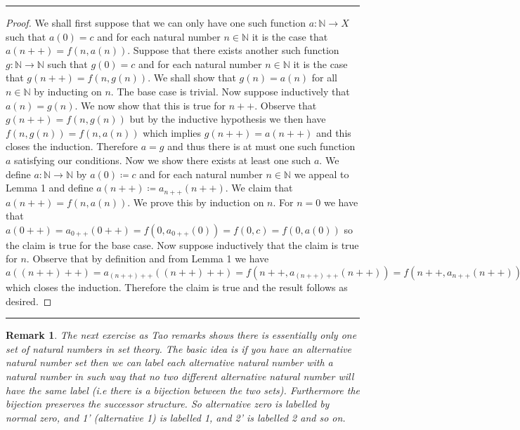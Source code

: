 \documentclass{article}
\newcommand{\lined}{\noindent\rule{\textwidth}{1pt}}
\newtheorem*{remark}{Remark}
\begin{document}
	\lined
	\begin{proof}
		We shall first suppose that we can only have one such function $a:\mathbb{N} \rightarrow X$ such that $a(0) = c$ and for each natural number $n \in \mathbb{N}$ it is the case that $a(n++) = f(n,a(n))$. Suppose that there exists another such function $g:\mathbb{N} \rightarrow \mathbb{N}$ such that $g(0) = c$ and for each natural number $n \in \mathbb{N}$ it is the case that $g(n++) = f(n,g(n))$. We shall show that $g(n) = a(n)$ for all $n \in \mathbb{N}$ by inducting on $n$. The base case is trivial. Now suppose inductively that $a(n) = g(n)$. We now show that this is true for $n++$. Observe that $g(n++) = f(n,g(n))$ but by the inductive hypothesis we then have $f(n,g(n)) = f(n,a(n))$ which implies $g(n++) = a(n++)$ and this closes the induction. Therefore $a = g$ and thus there is at must one such function $a$ satisfying our conditions. Now we show there exists at least one such $a$. We define $a:\mathbb{N} \rightarrow \mathbb{N}$ by $a(0) \coloneqq c$ and for each natural number $n \in \mathbb{N}$ we appeal to Lemma 1 and define $a(n++) \coloneqq a_{n++}(n++)$. We claim that $a(n++) = f(n,a(n))$. We prove this by induction on $n$. For $n = 0$ we have that $a(0++) = a_{0++}(0++) = f(0, a_{0++}(0))
		= f(0, c) = f(0, a(0))$ so the claim is true for the base case.
		Now suppose inductively that the claim is true for $n$. Observe that by definition and from Lemma 1 we have $a((n++)++) = a_{(n++)++}((n++)++) = f(n++,a_{(n++)++}(n++)) = f(n++, a_{n++}(n++)) =
		f(n, a(n++))$ which closes the induction. Therefore the claim is true and the result follows as desired.
		
	\end{proof}
	
	\lined
	
	\newpage
	
	\begin{remark}
		The next exercise as Tao remarks shows there is essentially only
		one set of natural numbers in set theory. The basic idea is if you have an alternative natural number set then we can label each alternative natural number with a natural number in such way that no two different alternative natural number will have the same label (i.e there is a bijection between the two sets). Furthermore the bijection preserves the successor structure. So alternative zero is labelled by normal zero, and 1' (alternative 1) is labelled 1, and 2' is labelled 2 and so on. 
	\end{remark}
	
\end{document}
